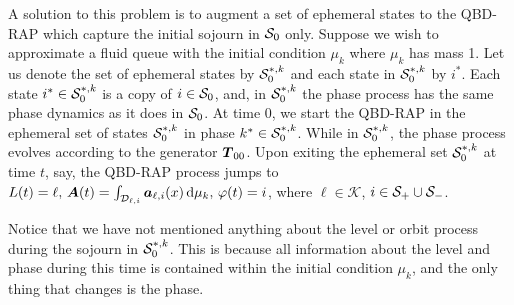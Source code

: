 A solution to this problem is to augment a set of ephemeral states to the QBD-RAP which capture the initial sojourn in \(\mathcal{S}_0\) only. Suppose we wish to approximate a fluid queue with the initial condition \(\mu_k\) where \(\mu_k\) has mass 1. Let us denote the set of ephemeral states by \(\mathcal{S}_0^{*,k}\) and each state in \(\mathcal{S}_0^{*,k}\) by \(i^*\). Each state \(i^*\in\mathcal{S}_0^{*,k}\) is a copy of \(i\in\mathcal{S}_0\), and, in \(\mathcal{S}_0^{*,k}\) the phase process has the same phase dynamics as it does in \(\mathcal{S}_0\). At time \(0\), we start the QBD-RAP in the ephemeral set of states \(\mathcal{S}_0^{*,k}\) in phase \(k^*\in\mathcal{S}_0^{*,k}\). While in \(\mathcal{S}_0^{*,k}\), the phase process evolves according to the generator \(\boldsymbol T_{00}\). Upon exiting the ephemeral set \(\mathcal{S}_0^{*,k}\) at time \(t\), say, the QBD-RAP process jumps to \(L(t)=\ell,\, \boldsymbol A(t)=\int_{\mathcal{D}_{\ell,i}}\boldsymbol a_{\ell,i}(x)\, \mathrm{d} \mu_k,\,\varphi(t)=i\), where \(\ell\in\mathcal K\), \(i\in\mathcal{S}_+\cup\mathcal{S}_-\). 

Notice that we have not mentioned anything about the level or orbit process during the sojourn in \(\mathcal{S}_0^{*,k}\). This is because all information about the level and phase during this time is contained within the initial condition \(\mu_k\), and the only thing that changes is the phase. 


